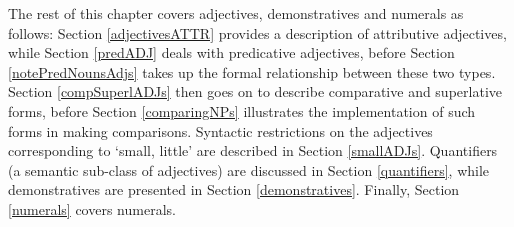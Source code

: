 The rest of this chapter covers adjectives, demonstratives and numerals as follows: Section \ref{adjectivesATTR} provides a description of attributive adjectives, %
while Section \ref{predADJ} deals with predicative adjectives, before Section \ref{notePredNounsAdjs} takes up the formal relationship between these two types. 
Section \ref{compSuperlADJs} then goes on to describe comparative and superlative forms, 
before Section \ref{comparingNPs} illustrates the implementation of such forms in making comparisons. 
Syntactic restrictions on the adjectives corresponding to ‘small, little’ are described in Section \ref{smallADJs}. 
Quantifiers (a semantic sub-class of adjectives) are discussed in Section \ref{quantifiers}, while 
demonstratives are presented in Section \ref{demonstratives}. 
Finally, Section \ref{numerals} covers numerals. %





